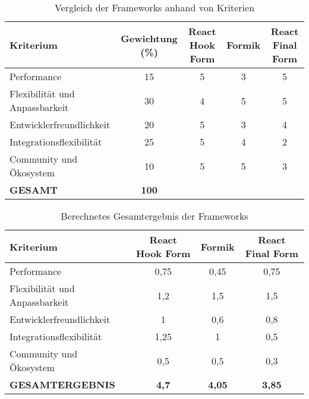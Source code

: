 \begin{table}[H]
	\centering
	\begin{tabular}{|l|c|c|c|c|}
		\hline
		\rowcolor[HTML]{B6D7A8} \textbf{Kriterium}           & \textbf{Gewichtung (\%)} & \textbf{React Hook Form} & \textbf{Formik} & \textbf{React Final Form} \\ \hline
		Performance                  & 15                       & 5                        & 3               & 5                         \\ \hline
		Flexibilität und Anpassbarkeit & 30                    & 4                        & 5               & 5                         \\ \hline
		Entwicklerfreundlichkeit     & 20                       & 5                        & 3               & 4                         \\ \hline
		Integrationsflexibilität     & 25                       & 5                        & 4               & 2                         \\ \hline
		Community und Ökosystem      & 10                       & 5                        & 5               & 3                         \\ \hline
		\textbf{GESAMT}              & \textbf{100}            &                          &                 &                           \\ \hline
	\end{tabular}
	\caption{Vergleich der Frameworks anhand von Kriterien}
	\label{tab:framework-comparison}
\end{table}

\begin{table}[H]
	\centering
	\begin{tabular}{|l|c|c|c|}
		\hline
		\rowcolor[HTML]{B6D7A8} \textbf{Kriterium}                 & \textbf{React Hook Form} & \textbf{Formik} & \textbf{React Final Form} \\ \hline
		Performance                        & 0,75                     & 0,45            & 0,75                      \\ \hline
		Flexibilität und Anpassbarkeit     & 1,2                      & 1,5             & 1,5                       \\ \hline
		Entwicklerfreundlichkeit           & 1                        & 0,6             & 0,8                       \\ \hline
		Integrationsflexibilität           & 1,25                     & 1               & 0,5                       \\ \hline
		Community und Ökosystem            & 0,5                      & 0,5             & 0,3                       \\ \hline
		\textbf{GESAMTERGEBNIS}            & \textbf{4,7}             & \textbf{4,05}   & \textbf{3,85}             \\ \hline
	\end{tabular}
	\caption{Berechnetes Gesamtergebnis der Frameworks}
	\label{tab:framework-results}
\end{table}

